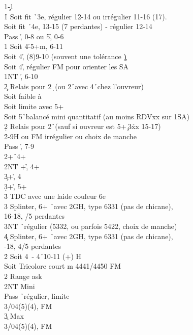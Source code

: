 \documentclass[a4paper]{article}
\begin{document}
\begin{bidtable}
1\c-1\d\\
1\h \> Soit fit \h\ 3e, régulier 12-14 ou irrégulier 11-16 (17).\\
\>Soit fit \h\ 4e, 13-15 (7 perdantes) - régulier 12-14\+\\
Pass \h , 0-8 ou 5\h , 0-6\\
1\s \> Soit 4\h -5+m, 6-11\\
\>Soit 4\h , (8)9-10 (souvent une tolérance \c )\\
\>Soit 4\h , régulier FM pour orienter les SA\\
1NT \h , 6-10\\
2\c \> Relais pour 2\d\ (ou 2\h\ avec 4\h\ chez l'ouvreur)\\
\>Soit faible à \d \\
\>Soit limite avec 5+\h \\
\>Soit 5\h\ balancé mini quantitatif (au moins RDVxx sur 1SA)\\
2\d \> Relais pour 2\h\ (sauf si ouvreur est 5+\c\ 3\h xx 15-17)\+\\
2\h {}-9H ou FM irrégulier ou choix de manche\+\\
Pass \h , 7-9\\
2\s {}+\h\ 4+\s \\
2NT +\h , 4+\c \\
3\c {}+\h , 4\d \\
3\d {}+\h , 5+\d \\
3\h \> TDC avec une laide couleur 6e\\
3\s \> Splinter, 6+ \h\ avec 2GH, type 6331 (pas de chicane),\+\\
16-18, /5 perdantes\-\\
3NT \h\ régulier (5332, ou parfois 5422, choix de manche)\\
4\c\d \> Splinter, 6+ \h\ avec 2GH, type 6331 (pas de chicane),\\
-18, 4/5 perdantes\-\-\\
2\h \> Soit 4\s\ - 4\h\ 10-11 (+) H\+\\
Soit \> Tricolore court m 4441/4450 FM\-\\
2\s \> Range ask\+\\
2NT \> Mini\+\\
Pass \h\ régulier, limite\\
3\s {}/04(5)(4), FM\-\\
3\c \> Max\+\\
3\s {}/04(5)(4), FM\\

\end{bidtable}
\end{document}
